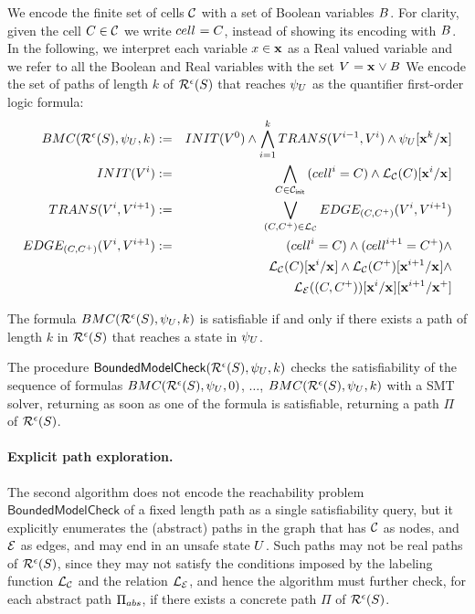 We encode the finite set of cells $\mathcal{C}$ with a set of Boolean
variables ${B}^{}$. For clarity, given the cell $C \in \mathcal{C}$ we
write ${cell}^{} = C$, instead of showing its encoding with ${B}^{}$.
%
In the following, we interpret each variable $x \in \mathbf{x}$ as a Real
valued variable and we refer to all the Boolean and Real variables
with the set ${V}^{} = {\mathbf{x}}^{} \vee {B}^{}$
%
We encode the set of paths of length $k$ of
$\mathcal{R}^{\epsilon}(S)$ that reaches ${\psi}_{U}$
as the quantifier first-order logic formula:
\begin{eqnarray*}
BMC(\mathcal{R}^{\epsilon}(S), {\psi}_{U}, k) & := &
INIT({V}^{0}) \wedge
\bigwedge_{i=1}^{k}{TRANS({V}^{i-1}, {V}^{i})} \wedge
{\ensuremath{{\psi}_{U}}}[{{\mathbf{x}}^{k}}/{{\mathbf{x}}^{}}]\\
INIT({V}^{i}) & := &
\bigwedge_{C \in \mathcal{C}_{\mathsf{init}}}{({cell}^{i} = C) \wedge
{\ensuremath \mathcal{L}_\ensuremath \mathcal{C}(C)}[{{\mathbf{x}}^{i}}/{{\mathbf{x}}^{}}]
}
\\
TRANS({V}^{i}, {V}^{i+1}) & := &
  \bigvee_{(C,C^+) \in \mathcal{L}_\mathcal{C}}{
    EDGE_{(C,C^+)}({V}^{i}, {V}^{i+1})
  } \\
EDGE_{(C,C^+)}({V}^{i}, {V}^{i+1}) & := &
({cell}^{i} = C) \wedge ({cell}^{i+1} = C^+) \wedge  \\
&& {\mathcal{L}_\mathcal{C}(C)}[{{\mathbf{x}}^{i}}/{{\mathbf{x}}^{}}] \wedge
   {\ensuremath \mathcal{L}_\ensuremath \mathcal{C}(C^+)}[{{\mathbf{x}}^{i+1}}/{{\mathbf{x}}^{}}] \wedge \\
&& {{\mathcal{L}_\mathcal{E}((C,C^+))}[{{\mathbf{x}}^{i}}/{{\mathbf{x}}^{}}]}[{{\mathbf{x}}^{i+1}}/{{{\mathbf{x}}^{+}}}]
\end{eqnarray*}

The formula
$BMC(\mathcal{R}^{\epsilon}(S), {\psi}_{U}, k)$ is satisfiable
if and only if there exists a path of length $k$ in 
$\mathcal{R}^{\epsilon}(S)$ that reaches a state in ${\psi}_{U}$.

The procedure
$\mathsf{BoundedModelCheck}(\mathcal{R}^{\epsilon}(S), {\psi}_{U}, k)$
checks the satisfiability of the sequence of formulas 
$BMC(\mathcal{R}^{\epsilon}(S), {\psi}_{U}, 0)$, 
$\ldots$,
$BMC(\mathcal{R}^{\epsilon}(S), {\psi}_{U}, k)$
with a SMT solver, returning as soon as one of the formula is
satisfiable, returning a path $\Pi$ of
$\mathcal{R}^{\epsilon}(S)$.

\paragraph{Explicit path exploration.}
The second algorithm does not encode the reachability problem
$\mathsf{BoundedModelCheck}$ of a fixed length path as a single
satisfiability query, but it explicitly enumerates
the (abstract) paths in the graph that has $\mathcal{C}$
as nodes, and $\mathcal{E}$ as edges, and may end in an unsafe state
$U$.
%
Such paths may not be real paths of
$\mathcal{R}^{\epsilon}(S)$, since they may not satisfy the
conditions imposed by the labeling function $\mathcal{L}_\mathcal{C}$
and the relation $\mathcal{L}_\mathcal{E}$, and hence the algorithm must
further check, for each abstract path $\Pi_{abs}$, if there exists a 
concrete path $\Pi$ of
$\mathcal{R}^{\epsilon}(S)$.

